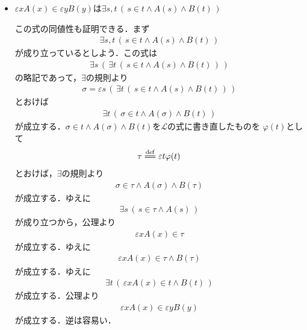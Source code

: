 \documentclass[a4j,10.5pt,oneside,openany]{jsbook}
\theoremstyle{mystyle}
\newcommand{\defeq}{\overset{\mathrm{def}}{=\joinrel=}} %
\begin{document}
\begin{itemize}
		\item $\varepsilon x A(x) \in \varepsilon y B(y)$は$\exists s,t\, \left(\, s \in t \wedge A(s) \wedge B(t)\, \right)$
		
			この式の同値性も証明できる．まず
			\begin{align}
				\exists s,t\, \left(\, s \in t \wedge A(s) \wedge B(t)\, \right)
			\end{align}
			が成り立っているとしよう．この式は
			\begin{align}
				\exists s\, \left(\, \exists t\, \left(\, s \in t \wedge A(s) \wedge B(t)\, \right)\, \right)
			\end{align}
			の略記であって，$\exists$の規則より
			\begin{align}
				\sigma = \varepsilon s\, \left(\, \exists t\, \left(\, s \in t \wedge A(s) \wedge B(t)\, \right)\, \right)
			\end{align}
			とおけば
			\begin{align}
				\exists t\, \left(\, \sigma \in t \wedge A(\sigma) \wedge B(t)\, \right)
			\end{align}
			が成立する．$\sigma \in t \wedge A(\sigma) \wedge B(t)$を$\mathcal{L}$の式に書き直したものを
			$\varphi(t)$として
			\begin{align}
				\tau \defeq \varepsilon t \varphi(t)
			\end{align}
			とおけば，$\exists$の規則より
			\begin{align}
				\sigma \in \tau \wedge A(\sigma) \wedge B(\tau)
			\end{align}
			が成立する．ゆえに
			\begin{align}
				\exists s\, \left(\, s \in \tau \wedge A(s)\, \right)
			\end{align}
			が成り立つから，公理より
			\begin{align}
				\varepsilon x A(x) \in \tau
			\end{align}
			が成立する．ゆえに
			\begin{align}
				\varepsilon x A(x) \in \tau \wedge B(\tau)
			\end{align}
			が成立する．ゆえに
			\begin{align}
				\exists t\, \left(\, \varepsilon x A(x) \in t \wedge B(t)\, \right)
			\end{align}
			が成立する．公理より
			\begin{align}
				\varepsilon x A(x) \in \varepsilon y B(y)
			\end{align}
			が成立する．逆は容易い．
			\begin{align}

\end{align}
\end{itemize}
\end{document}

